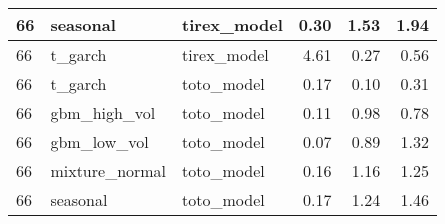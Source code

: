 {\begin{tabular}{lllrrr}
\midrule
66 & seasonal & tirex\_model & 0.30 & 1.53 & 1.94 \\
\midrule
66 & t\_garch & tirex\_model & 4.61 & 0.27 & 0.56 \\
\midrule
66 & t\_garch & toto\_model & 0.17 & 0.10 & 0.31 \\
\midrule
66 & gbm\_high\_vol & toto\_model & 0.11 & 0.98 & 0.78 \\
\midrule
66 & gbm\_low\_vol & toto\_model & 0.07 & 0.89 & 1.32 \\
\midrule
66 & mixture\_normal & toto\_model & 0.16 & 1.16 & 1.25 \\
\midrule
66 & seasonal & toto\_model & 0.17 & 1.24 & 1.46 \\
\bottomrule
\end{tabular}
}